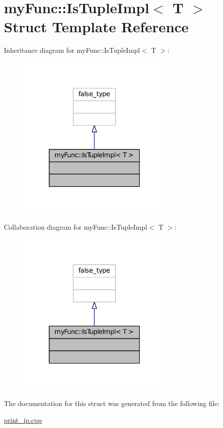 \hypertarget{structmyFunc_1_1IsTupleImpl}{}\section{my\+Func\+:\+:Is\+Tuple\+Impl$<$ T $>$ Struct Template Reference}
\label{structmyFunc_1_1IsTupleImpl}


Inheritance diagram for my\+Func\+:\+:Is\+Tuple\+Impl$<$ T $>$\+:
\nopagebreak
\begin{figure}[H]
\begin{center}
\leavevmode
\includegraphics[width=219pt]{structmyFunc_1_1IsTupleImpl__inherit__graph}
\end{center}
\end{figure}


Collaboration diagram for my\+Func\+:\+:Is\+Tuple\+Impl$<$ T $>$\+:
\nopagebreak
\begin{figure}[H]
\begin{center}
\leavevmode
\includegraphics[width=219pt]{structmyFunc_1_1IsTupleImpl__coll__graph}
\end{center}
\end{figure}


The documentation for this struct was generated from the following file\+:\begin{DoxyCompactItemize}
\item 
\hyperlink{print__ip_8cpp}{print\+\_\+ip.\+cpp}\end{DoxyCompactItemize}
